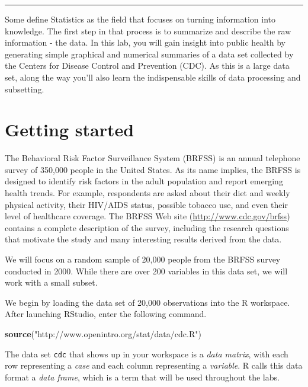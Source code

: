 \documentclass[]{book}
\newenvironment{Shaded}{\begin{snugshade}}{\end{snugshade}}
\newcommand{\KeywordTok}[1]{\textcolor[rgb]{0.13,0.29,0.53}{\textbf{#1}}}
\newcommand{\NormalTok}[1]{#1}
\newcommand{\StringTok}[1]{\textcolor[rgb]{0.31,0.60,0.02}{#1}}
\theoremstyle{definition}
\theoremstyle{definition}
\theoremstyle{definition}
\theoremstyle{remark}
\begin{document}
\begin{center}\rule{0.5\linewidth}{\linethickness}\end{center}

Some define Statistics as the field that focuses on turning information
into knowledge. The first step in that process is to summarize and
describe the raw information - the data. In this lab, you will gain
insight into public health by generating simple graphical and numerical
summaries of a data set collected by the Centers for Disease Control and
Prevention (CDC). As this is a large data set, along the way you'll also
learn the indispensable skills of data processing and subsetting.

\hypertarget{getting-started}{%
\section{Getting started}\label{getting-started}}

The Behavioral Risk Factor Surveillance System (BRFSS) is an annual
telephone survey of 350,000 people in the United States. As its name
implies, the BRFSS is designed to identify risk factors in the adult
population and report emerging health trends. For example, respondents
are asked about their diet and weekly physical activity, their HIV/AIDS
status, possible tobacco use, and even their level of healthcare
coverage. The BRFSS Web site (\url{http://www.cdc.gov/brfss}) contains a
complete description of the survey, including the research questions
that motivate the study and many interesting results derived from the
data.

We will focus on a random sample of 20,000 people from the BRFSS survey
conducted in 2000. While there are over 200 variables in this data set,
we will work with a small subset.

We begin by loading the data set of 20,000 observations into the R
workspace. After launching RStudio, enter the following command.

\begin{Shaded}
\begin{Highlighting}[]
\KeywordTok{source}\NormalTok{(}\StringTok{"http://www.openintro.org/stat/data/cdc.R"}\NormalTok{)}
\end{Highlighting}
\end{Shaded}

The data set \texttt{cdc} that shows up in your workspace is a
\emph{data matrix}, with each row representing a \emph{case} and each
column representing a \emph{variable}. R calls this data format a
\emph{data frame}, which is a term that will be used throughout the
labs.
\end{document}
